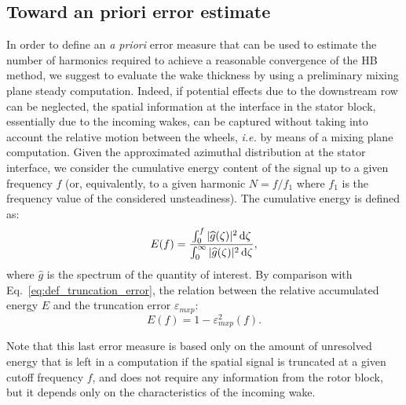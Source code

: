 \subsection{Toward an priori error estimate}
In order to define an \emph{a priori} error measure 
that can be used to estimate the number of 
harmonics required to achieve a reasonable 
convergence of the HB method, we suggest to 
evaluate the wake thickness by using a preliminary 
mixing plane steady computation. Indeed, if 
potential effects due to the downstream row can 
be neglected, the spatial information at the interface 
in the stator block, essentially due to the incoming 
wakes, can be captured without taking into account 
the relative motion between the wheels, \emph{i.e.} 
by means of a mixing plane computation. 
Given the approximated azimuthal distribution at 
the stator interface, we consider the cumulative
energy content of the signal up to a given frequency $f$ 
(or, equivalently, to a given harmonic $N=f/f_1$ where $f_1$ is the
frequency value of the considered unsteadiness). 
The cumulative energy is defined as:
\begin{equation}
    E(f) = \frac{
      \int_0^f | \widehat{g}(\zeta)|^2 \mathop{}\!\mathrm{d} \zeta
    }{
      \int_0^\infty | \widehat{g}(\zeta)|^2 \mathop{}\!\mathrm{d} \zeta
    },
\end{equation}
where $\widehat{g}$ is the spectrum of the quantity of interest.
By comparison with Eq.~\eqref{eq:def_truncation_error},
the relation between the relative accumulated energy $E$
and the truncation error $\varepsilon_{mxp}$:
\begin{equation}
    E(f) = 1 - \varepsilon_{mxp}^2 (f).
    \label{eq:correspond_E_error}
\end{equation}


Note that this last error measure is based only on 
the amount of unresolved energy that is left 
in a computation if the spatial signal is 
truncated at a given cutoff frequency $f$, 
and does not require any information from the rotor
block, but it depends only on the characteristics 
of the incoming wake.

